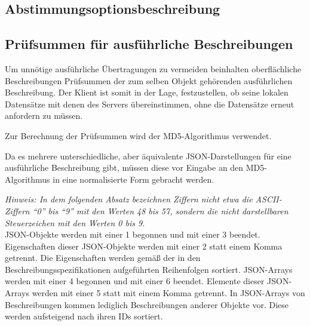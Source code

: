 \documentclass[parskip=full,11pt]{scrartcl}
\begin{document}
\subsection{Abstimmungsoptionsbeschreibung}\label{sec:polloptiondesc}

\subsection{Prüfsummen für ausführliche Beschreibungen}\label{sec:checksum}
\newcommand{\hashAlg}{MD5}
Um unnötige ausführliche Übertragungen zu vermeiden beinhalten oberflächliche
Beschreibungen Prüfsummen der zum selben Objekt gehörenden ausführlichen
Beschreibung.
Der Klient ist somit in der Lage, festzustellen, ob seine lokalen Datensätze
mit denen des Servers übereinstimmen, ohne die Datensätze erneut anfordern zu
müssen.

\par Zur Berechnung der Prüfsummen wird der \hashAlg-Algorithmus verwendet.

\par Da es mehrere unterschiedliche, aber äquivalente JSON-Darstellungen für
eine ausführliche Beschreibung gibt, müssen diese vor Eingabe an den
\hashAlg-Algorithmus in eine normalisierte Form gebracht werden.

\par \textit{Hinweis: In dem folgenden Absatz bezeichnen Ziffern nicht etwa die
ASCII-Ziffern \enquote{0} bis \enquote{9} mit den Werten 48 bis 57, sondern die
nicht darstellbaren Steuerzeichen mit den Werten 0 bis 9.}\\
JSON-Objekte werden mit einer 1 begonnen und mit einer 3 beendet.
Eigenschaften dieser JSON-Objekte werden mit einer 2 statt einem Komma
getrennt.
Die Eigenschaften werden gemäß der in den Beschreibungsspezifikationen
aufgeführten Reihenfolgen sortiert.
JSON-Arrays werden mit einer 4 begonnen und mit einer 6 beendet.
Elemente dieser JSON-Arrays werden mit einer 5 statt mit einem Komma getrennt.
In JSON-Arrays von Beschreibungen kommen lediglich Beschreibungen anderer
Objekte vor. Diese werden aufsteigend nach ihren IDs sortiert.
\end{document}
